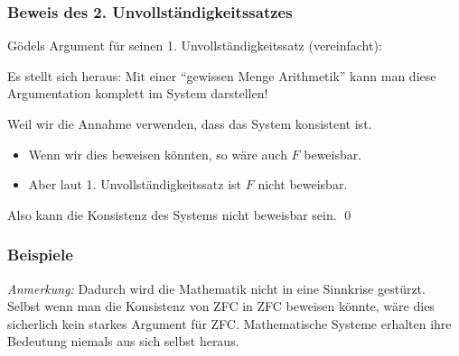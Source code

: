 \documentclass[aspectratio=1610,onlymath]{beamer}
\begin{document}
\begin{frame}\frametitle{Beweis des 2. Unvollständigkeitssatzes}

\alert{Gödels Argument für seinen 1. Unvollständigkeitssatz (vereinfacht):}

Es stellt sich heraus: Mit einer "`gewissen Menge Arithmetik"' kann man diese Argumentation komplett im System darstellen!\medskip\pause

\pause\bigskip

\alert{Weil wir die Annahme verwenden, dass das System konsistent ist.}
\begin{itemize}
\item Wenn wir dies beweisen könnten, so wäre auch $F$ beweisbar.
\item Aber laut 1. Unvollständigkeitssatz ist $F$ nicht beweisbar.
\end{itemize}
Also kann die Konsistenz des Systems nicht beweisbar sein. \qed

\end{frame}

\begin{frame}\frametitle{Beispiele}

\bigskip\pause

\bigskip\pause

\emph{Anmerkung:} Dadurch wird die Mathematik nicht in eine Sinnkrise gestürzt. Selbst wenn
man die Konsistenz von ZFC in ZFC beweisen könnte, wäre dies sicherlich kein starkes Argument für ZFC. Mathematische Systeme erhalten ihre Bedeutung niemals aus sich selbst heraus.

\end{frame}
\end{document}
